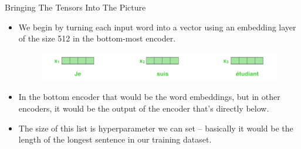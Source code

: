 \documentclass[handout]{beamer}
\begin{document}
\begin{frame}{Bringing The Tensors Into The Picture}
\begin{scriptsize}
\begin{itemize}



\item We begin by turning each input word into a vector using an embedding layer  of the size 512 in the bottom-most encoder.

\begin{figure}[h]
        	\includegraphics[scale = 0.35]{pics/embeddings_enc.png}
        \end{figure}  




\item In the bottom encoder that would be the word embeddings, but in other encoders, it would be the output of the encoder that's directly below.

\item The size of this list is hyperparameter we can set – basically it would be the length of the longest sentence in our training dataset.


\end{itemize}

\end{scriptsize}

    

\end{frame}
\end{document}
